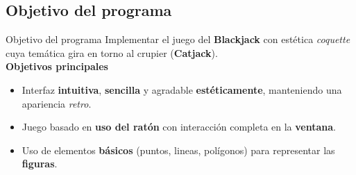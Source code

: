 \subsection{Objetivo del programa}
\begin{frame}{Objetivo del programa}
    Implementar el juego del \textbf{Blackjack} con estética \textit{coquette} cuya temática gira en torno al crupier (\textbf{Catjack}).\\
    \textbf{Objetivos principales}
    \begin{itemize}
        \item Interfaz \textbf{intuitiva}, \textbf{sencilla} y agradable \textbf{estéticamente}, manteniendo una apariencia \textit{retro}.
        \item Juego basado en \textbf{uso del ratón} con interacción completa en la \textbf{ventana}.
        \item Uso de elementos \textbf{básicos} (puntos, lineas, polígonos) para representar las  \textbf{figuras}.
    \end{itemize}
\end{frame}



